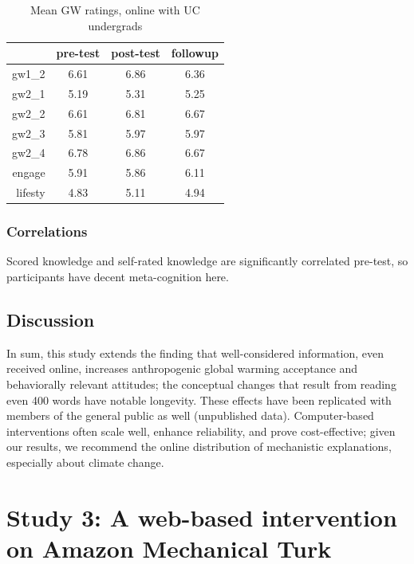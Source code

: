 \begin{table}[h]
\caption{Mean GW ratings, online with UC undergrads} 
\label{table:uc-online-gw-means}
\centering
\begin{tabular}{>{\sffamily}rccc}
  \toprule
 & pre-test & post-test & followup \\ 
  \midrule
  gw1\_2 & 6.61 & 6.86 & 6.36 \\ 
  gw2\_1 & 5.19 & 5.31 & 5.25 \\ 
  gw2\_2 & 6.61 & 6.81 & 6.67 \\ 
  gw2\_3 & 5.81 & 5.97 & 5.97 \\ 
  gw2\_4 & 6.78 & 6.86 & 6.67 \\ 
  engage & 5.91 & 5.86 & 6.11 \\ 
  lifesty & 4.83 & 5.11 & 4.94 \\ 
  \bottomrule
\end{tabular}
\end{table}



\subsubsection{Correlations}

Scored knowledge and self-rated knowledge are significantly correlated pre-test,
so participants have decent meta-cognition here.

\subsection{Discussion}

In sum, this study extends the finding that well-considered information, even
received online, increases anthropogenic global warming acceptance and
behaviorally relevant attitudes; the conceptual changes that result from reading
even 400 words have notable longevity. These effects have been replicated with
members of the general public as well (unpublished data). Computer-based
interventions often scale well, enhance reliability, and prove cost-effective;
given our results, we recommend the online distribution of mechanistic
explanations, especially about climate change.  




\section{Study 3: A web-based intervention on Amazon Mechanical Turk}

